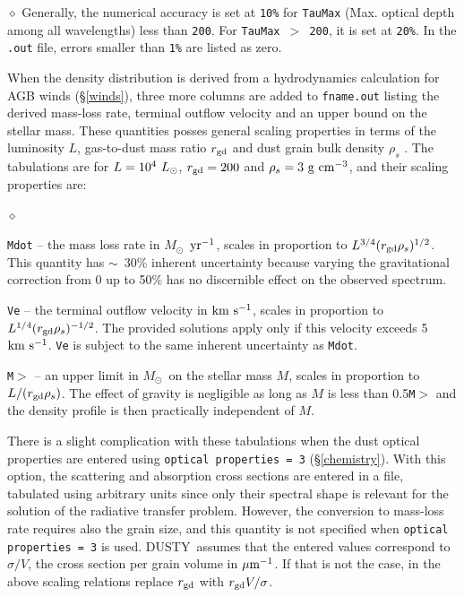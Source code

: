 \documentclass[11pt]{article}
\def\D  {{\sf DUSTY}}
\def\E#1{\hbox{$10^{#1}$}}
\def\about  {\hbox{$\sim$}}
\def\mic    {\hbox{$\mu$m}}
\def\Mo     {\hbox{$M_{\odot}$}}
\def\Lo     {\hbox{$L_{\odot}$}}
\def\kms    {\hbox{$\rm km\ s^{-1}$}}
\begin{document}
\begin{list}{$\diamond$}{}
Generally, the numerical accuracy is set at {\tt 10\%} for {\tt TauMax} (Max. optical 
depth among all wavelengths) less than {\tt 200}. For {\tt TauMax $>$ 200}, it is set at 
{\tt 20\%}. In the {\tt .out} file, errors smaller than {\tt 1\%} are listed as zero.
\end{list}


When the density distribution is derived from a hydrodynamics calculation for
AGB winds (\S\ref{winds}), three more columns are added to {\tt fname.out}
listing the derived mass-loss rate, terminal outflow velocity and an upper
bound on the stellar mass.  These quantities posses general scaling properties
in terms of the luminosity $L$, gas-to-dust mass ratio $r_{\rm gd}$ and dust
grain bulk density $\rho_s$ \cite{IEprep}.  The tabulations are for $L = \E4\
\Lo$, $r_{\rm gd} = 200$ and $\rho_s = 3\ \rm g~cm^{-3}$, and their scaling
properties are:
\begin{list}{$\diamond$}{}
\item
{\tt Mdot} -- the mass loss rate in \Mo\ $\rm yr^{-1}$, scales in proportion to
$L^{3/4}(r_{\rm gd}\rho_s)^{1/2}$.  This quantity has \about\ 30\% inherent
uncertainty because varying the gravitational correction from 0 up to 50\% has
no discernible effect on the observed spectrum.
\item
{\tt Ve} -- the terminal outflow velocity in \kms, scales in proportion to
$L^{1/4}(r_{\rm gd}\rho_s)^{-1/2}$. The provided solutions apply only if this
velocity exceeds 5 \kms.  {\tt Ve} is subject to the same inherent uncertainty
as {\tt Mdot}.
\item
{\tt M$>$} -- an upper limit in \Mo\ on the stellar mass $M$, scales in
proportion to $L/(r_{\rm gd}\rho_s)$.  The effect of gravity is negligible as
long as $M$ is less than 0.5{\tt *M$>$} and the density profile is then
practically independent of $M$.

\end{list}
There is a slight complication with these tabulations when the dust optical
properties are entered using {\tt optical properties = 3} (\S \ref{chemistry}).
With this option, the scattering and absorption cross sections are entered in a
file, tabulated using arbitrary units since only their spectral shape is
relevant for the solution of the radiative transfer problem. However, the
conversion to mass-loss rate requires also the grain size, and this quantity is
not specified when {\tt optical properties = 3} is used.  \D\ assumes that the
entered values correspond to $\sigma/V$, the cross section per grain volume in
$\mic^{-1}$.  If that is not the case, in the above scaling relations replace
$r_{\rm gd}$ with $r_{\rm gd}V/\sigma$.
\end{document}
